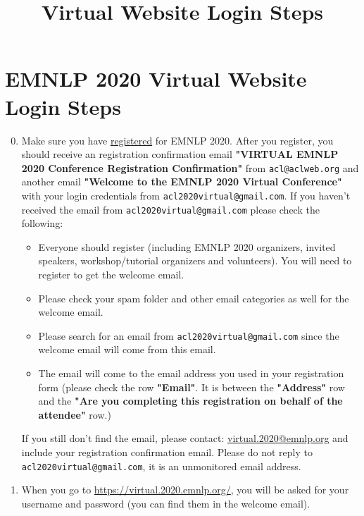\documentclass[11pt]{scrartcl}
\title{\conferenceName Virtual Website Login Steps}
\makeatletter
\newcommand{\conferenceName}{EMNLP 2020\xspace}
\newcommand{\registrationUrl}{https://aclweb.org/conference/virtual-emnlp-2020-conference-registration/}
\newcommand{\virtualConferenceUrl}{https://virtual.2020.emnlp.org/}
\newcommand{\loginCredentialEmail}{acl2020virtual@gmail.com}	%
\newcommand{\helpdeskEmail}{virtual.2020@emnlp.org}
\makeatother
\begin{document}
\section*{\conferenceName Virtual Website Login Steps}
	
\begin{enumerate}
	\setcounter{enumi}{-1}
	\item
		\label{step:registration}
		\begin{sloppypar}
			Make sure you have \href{\registrationUrl}{registered} for \conferenceName. After you register, you should receive an registration confirmation email \textbf{"VIRTUAL \conferenceName Conference Registration Confirmation"} from \nolinkurl{acl@aclweb.org} and another email \textbf{"Welcome to the \conferenceName Virtual Conference"} with your login credentials from \nolinkurl{\loginCredentialEmail}. If you haven't received the email from \nolinkurl{\loginCredentialEmail} please check the following:
			
			\begin{itemize}
				\item Everyone should register (including \conferenceName organizers, invited speakers, workshop/tutorial organizers and volunteers). You will need to register to get the welcome email.
				\item Please check your spam folder and other email categories as well for the welcome email.
				\item Please search for an email from \nolinkurl{\loginCredentialEmail} since the welcome email will come from this email.
				\item The email will come to the email address you used in your registration form (please check the row \textbf{"Email"}. It is between the \textbf{"Address"} row and the \textbf{"Are you completing this registration on behalf of the attendee"} row.)
			\end{itemize}
		
			If you still don't find the email, please contact: \href{mailto:\helpdeskEmail}{\helpdeskEmail} and include your registration confirmation email. Please do not reply to \nolinkurl{\loginCredentialEmail}, it is an unmonitored email address.
		\end{sloppypar}
	\item
		\begin{sloppypar}
			When you go to \url{\virtualConferenceUrl}, you will be asked for your username and password (you can find them in the welcome email).
			

\end{sloppypar}
\end{enumerate}
\end{document}

